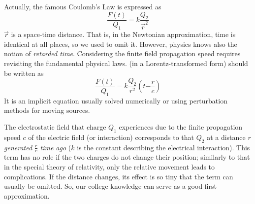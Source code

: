 {

Actually,  the famous Coulomb's Law is expressed as
\begin{equation}
\frac{F(t)}{Q_{1}}=k\frac{Q_{2}}{{\overrightarrow{r}}^{2}}\label{eq:CoulombTimeDependentSpaceTime}
\end{equation}
\noindent $\overrightarrow{r}$ is a space-time distance.
That is, in the Newtonian approximation, time is identical at all places,
so we used to omit it. 
However, physics knows also the notion of \textit{retarded time}.
Considering the finite field propagation speed requires revisiting
the fundamental physical laws. (in a Lorentz-transformed form) should be written as
%
\begin{equation}
\frac{F(t)}{Q_{1}}=k\frac{Q_{2}}{r^{2}}(t{-\frac{r}{c}})\label{eq:CoulombTimeDependent}
\end{equation}
%
\noindent
It is an implicit equation usually solved numerically or using perturbation methods for moving sources.
 
The electrostatic field that charge $Q_1$ experiences
due to the finite propagation speed $c$ of the electric
field (or interaction) corresponds to that $Q_2$ at
a distance $r$ \textit{generated $\frac{r}{c}$ time ago}
($k$ is the constant describing the electrical interaction). This term
has no role if the two charges do not change their position; similarly
to that in the special theory of relativity, only the relative movement
leads to complications. If the distance changes, its effect is so
tiny that the term can usually be omitted. So, our college knowledge
can serve as a good first approximation.


}
